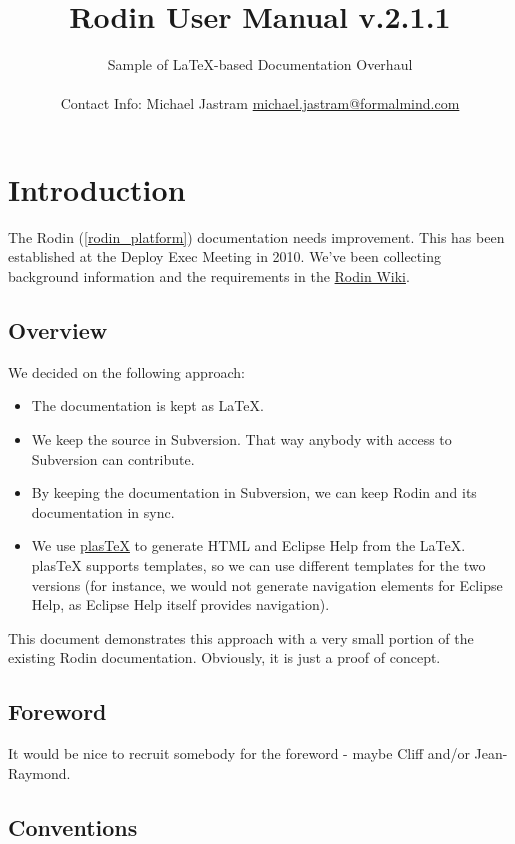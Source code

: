 \documentclass{book}
\title{Rodin User Manual v.2.1.1}
\author{Sample of \LaTeX-based Documentation Overhaul\\ \\
Contact Info: Michael Jastram \href{mailto:michael.jastram@formalmind.com}{michael.jastram@formalmind.com}}
\begin{document}
        

\maketitle

\chapter{Introduction}

The Rodin (\ref{rodin_platform}) documentation needs improvement.  This has been established at the Deploy Exec Meeting in 2010.  We've been collecting background information and the requirements in the \href{http://wiki.event-b.org/index.php/User_Documentation_Overhaul}{Rodin Wiki}.

\section{Overview}

We decided on the following approach:

\begin{itemize}
\item The documentation is kept as \LaTeX.
\item We keep the source in Subversion.  That way anybody with access to Subversion can contribute.
\item By keeping the documentation in Subversion, we can keep Rodin and its documentation in sync.
\item We use \href{http://plastex.sourceforge.net/}{plasTeX} to generate HTML and Eclipse Help from the \LaTeX.  plasTeX supports templates, so we can use different templates for the two versions (for instance, we would not generate navigation elements for Eclipse Help, as Eclipse Help itself provides navigation).
\end{itemize}

This document demonstrates this approach with a very small portion of the existing Rodin documentation.  Obviously, it is just a proof of concept.

\section{Foreword}

It would be nice to recruit somebody for the foreword - maybe Cliff and/or Jean-Raymond.

\section{Conventions}
\label{conventions}
\end{document}
